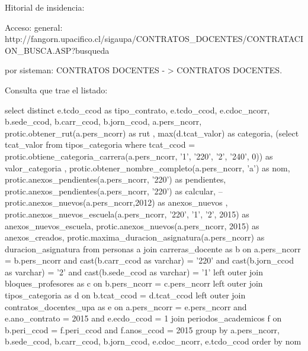 Hitorial de insidencia:

Acceso: general: http://fangorn.upacifico.cl/sigaupa/CONTRATOS_DOCENTES/CONTRATACION_BUSCA.ASP?busqueda%

por sisteman: CONTRATOS DOCENTES - > CONTRATOS DOCENTES.



Consulta que trae el listado:

select distinct e.tcdo_ccod                                               as 
                tipo_contrato, 
                e.tcdo_ccod, 
                e.cdoc_ncorr, 
                b.sede_ccod, 
                b.carr_ccod, 
                b.jorn_ccod, 
                a.pers_ncorr, 
                protic.obtener_rut(a.pers_ncorr)                          as rut 
                , 
                max(d.tcat_valor) 
                as categoria, 
                (select tcat_valor 
                 from   tipos_categoria 
                 where  tcat_ccod = 
                        protic.obtiene_categoria_carrera(a.pers_ncorr, 
                        '1', 
                                            '220', '2', 
                                '240', 0))        as valor_categoria 
                , 
                protic.obtener_nombre_completo(a.pers_ncorr, 
                'a')         as nom, 
                protic.anexos_pendientes(a.pers_ncorr, '220') as 
                pendientes, 
                protic.anexos_pendientes(a.pers_ncorr, '220') as 
                calcular, 
                --protic.anexos_nuevos(a.pers_ncorr,2012) as anexos_nuevos ,    
                protic.anexos_nuevos_escuela(a.pers_ncorr, '220', 
                '1', '2', 2015)   as 
                anexos_nuevos_escuela, 
                protic.anexos_nuevos(a.pers_ncorr, 2015)          as 
                anexos_creados, 
                protic.maxima_duracion_asignatura(a.pers_ncorr)           as 
                duracion_asignatura 
from   personas a 
       join carreras_docente as b 
         on a.pers_ncorr = b.pers_ncorr 
            and cast(b.carr_ccod as varchar) = '220' 
            and cast(b.jorn_ccod as varchar) = '2' 
            and cast(b.sede_ccod as varchar) = '1' 
       left outer join bloques_profesores as c 
                    on b.pers_ncorr = c.pers_ncorr 
       left outer join tipos_categoria as d 
                    on b.tcat_ccod = d.tcat_ccod 
       left outer join contratos_docentes_upa as e 
                    on a.pers_ncorr = e.pers_ncorr 
                       and e.ano_contrato = 2015 
                       and e.ecdo_ccod = 1 
       join periodos_academicos f 
         on b.peri_ccod = f.peri_ccod 
            and f.anos_ccod = 2015 
group  by a.pers_ncorr, 
          b.sede_ccod, 
          b.carr_ccod, 
          b.jorn_ccod, 
          e.cdoc_ncorr, 
          e.tcdo_ccod 
order  by nom 


